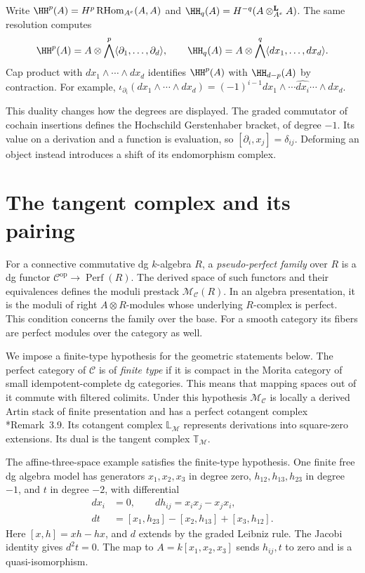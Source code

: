 Write $\HH^p(A)=H^p\operatorname{RHom}_{A^e}(A,A)$ and
$\HH_q(A)=H^{-q}(A\otimes_{A^e}^{\mathbf L}A)$.
The same resolution computes
\[
 \HH^p(A)=A\otimes\bigwedge^p\langle\partial_1,\ldots,\partial_d\rangle,
 \qquad
 \HH_q(A)=A\otimes\bigwedge^q\langle dx_1,\ldots,dx_d\rangle.
\]
Cap product with $dx_1\wedge\cdots\wedge dx_d$ identifies
$\HH^p(A)$ with $\HH_{d-p}(A)$ by contraction. For example,
$\iota_{\partial_i}(dx_1\wedge\cdots\wedge dx_d)
=(-1)^{i-1}dx_1\wedge\cdots\widehat{dx_i}\cdots\wedge dx_d$.

This duality changes how the degrees are displayed. The graded
commutator of cochain insertions defines the Hochschild Gerstenhaber
bracket, of degree $-1$. Its value on a derivation and a function is
evaluation, so $[\partial_i,x_j]=\delta_{ij}$. Deforming an object instead
introduces a shift of its endomorphism complex.

\section{The tangent complex and its pairing}
\label{cygeom:sec:tangent}

For a connective commutative dg $k$-algebra $R$, a \emph{pseudo-perfect
family} over $R$ is a dg functor
$\mathcal C^{\mathrm{op}}\to\operatorname{Perf}(R)$.
The derived space of such functors and their equivalences defines the
moduli prestack $\mathcal M_{\mathcal C}(R)$. In an algebra presentation,
it is the moduli of right $A\otimes R$-modules whose underlying
$R$-complex is perfect. This condition concerns the family over the
base. For a smooth category its fibers are perfect modules over the
category as well.

We impose a finite-type hypothesis for the geometric statements below.
The perfect category of $\mathcal C$ is of \emph{finite type} if it is
compact in the Morita category of small idempotent-complete dg categories.
This means that mapping spaces out of it commute with filtered colimits.
Under this hypothesis $\mathcal M_{\mathcal C}$ is locally a derived
Artin stack of finite presentation and has a perfect cotangent complex
\cite{cygeom:BD-moduli}*{Remark~3.9}. Its cotangent complex
$\mathbb L_{\mathcal M}$ represents derivations into square-zero
extensions. Its dual is the tangent complex $\mathbb T_{\mathcal M}$.

The affine-three-space example satisfies the finite-type hypothesis.
One finite free dg algebra model has generators
$x_1,x_2,x_3$ in degree zero, $h_{12},h_{13},h_{23}$ in degree $-1$,
and $t$ in degree $-2$, with differential
\begin{equation}\label{cygeom:eq:finite-model}
 \begin{split}
 dx_i&=0,\qquad dh_{ij}=x_ix_j-x_jx_i,\\
 dt&=[x_1,h_{23}]-[x_2,h_{13}]+[x_3,h_{12}].
 \end{split}
\end{equation}
Here $[x,h]=xh-hx$, and $d$ extends by the graded Leibniz rule.
The Jacobi identity gives $d^2t=0$. The map to
$A=k[x_1,x_2,x_3]$ sends $h_{ij},t$ to zero and is a quasi-isomorphism.

